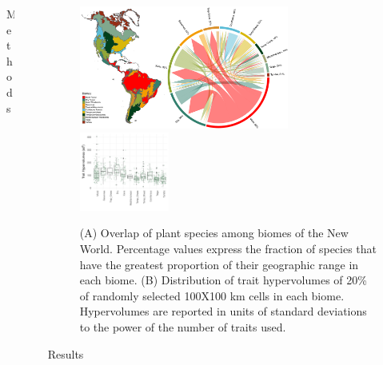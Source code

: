 \documentclass[final]{beamer}
\newlength{\sepwid}
\newlength{\onecolwid}
\newlength{\twocolwid}
\begin{document}
\begin{frame}[t]
\begin{columns}[t]
\begin{column}{\onecolwid}
\begin{alertblock}{Methods}
	\end{alertblock}

    \end{column}


    \begin{column}{\sepwid}\end{column}			%
    \begin{column}{\twocolwid}							%

\begin{figure}[h]
	\centering
	\includegraphics[width=0.7\textwidth]{./figures/Figure1.pdf}
	~
	\includegraphics[width=0.3\textwidth]{./figures/Hypervolume_sp_sample_gaussian20perc.pdf}
	\caption{(A) Overlap of plant species among biomes of the New World. Percentage values express the fraction of species that have the greatest proportion of their geographic range in each biome. (B) Distribution of trait hypervolumes of 20\% of randomly selected 100X100 km cells in each biome. Hypervolumes are reported in units of standard deviations to the power of the number of traits used.}
	\label{fig:map}
\end{figure}



\begin{alertblock}{Results}


		 
\begin{multicols}{2}


\end{multicols}
\end{alertblock}
\end{column}
\end{columns}
\end{frame}
\end{document}
